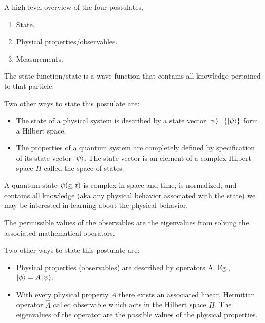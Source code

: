 \documentclass{school-22.101-notes}
\date{September 12, 2011}
\begin{document}
\maketitle

A high-level overview of the four postulates, 
\begin{enumerate}
\item State. 
\item Physical properties/observables. 
\item Measurements. 
\end{enumerate}

\begin{axiom} 
    The state function/state is a wave function that contains all knowledge pertained to that particle. 
\end{axiom}
Two other ways to state this postulate are: 
\begin{itemize}
\item The state of a physical system is described by a state vector $\left| \psi \right>$. $\left\{ \left| \psi \right> \right\}$ form a Hilbert space.
\item The properties of a quantum system are completely defined by specification of its state vector $\left| \psi \right>$. The state vector is an element of a complex Hilbert space $H$ called the space of states.
\end{itemize}
A quantum state $\psi(\underline{x}, t)$ is complex in space and time, is normalized, and contains all knowledge (aka any physical behavior associated with the state) we may be interested in learning about the physical behavior. 


\clearpage
{}
\begin{axiom} 
    The \uline{permissible} values of the observables are the eigenvalues from solving the associated mathematical operators.
\end{axiom}
Two other ways to state this postulate are:
\begin{itemize}
\item Physical properties (observables) are described by operators A. Eg., $\left| \phi \right> = A \left| \psi \right>$. 
\item With every physical property $A$ there exists an associated linear, Hermitian operator $\hat{A}$ called observable which acts in the Hilbert space $H$. The eigenvalues of the operator are the possible values of the physical properties.
\end{itemize}
\end{document}

